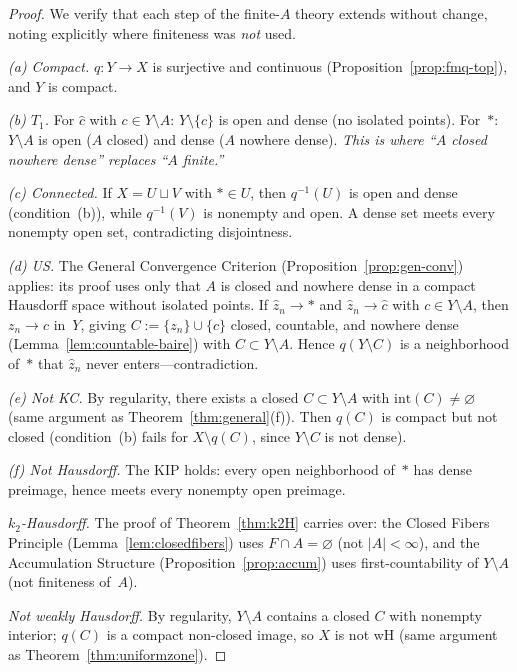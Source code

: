 \documentclass[11pt]{article}
\theoremstyle{definition}
\theoremstyle{remark}
\begin{document}
\begin{proof}
We verify that each step of the finite-$A$ theory extends without
change, noting explicitly where finiteness was \emph{not} used.

\emph{(a) Compact.}\;
$q\colon Y \to X$ is surjective and continuous (Proposition~\ref{prop:fmq-top}),
and $Y$ is compact.

\emph{(b) $T_1$.}\;
For $\hat{c}$ with $c \in Y \setminus A$: $Y \setminus \{c\}$ is
open and dense (no isolated points).
For~$\ast$: $Y \setminus A$ is open ($A$ closed) and dense
($A$ nowhere dense).
\emph{This is where ``$A$ closed nowhere dense'' replaces ``$A$ finite.''}

\emph{(c) Connected.}\;
If $X = U \sqcup V$ with $\ast \in U$, then $q^{-1}(U)$ is open and
dense (condition~(b)), while $q^{-1}(V)$ is nonempty and open.
A dense set meets every nonempty open set, contradicting disjointness.

\emph{(d) US.}\;
The General Convergence Criterion (Proposition~\ref{prop:gen-conv})
applies: its proof uses only that $A$ is closed and nowhere dense
in a compact Hausdorff space without isolated points.
If $\hat{z}_n \to \ast$ and $\hat{z}_n \to \hat{c}$ with
$c \in Y \setminus A$, then $z_n \to c$ in~$Y$, giving
$C := \{z_n\} \cup \{c\}$ closed, countable, and nowhere dense
(Lemma~\ref{lem:countable-baire}) with $C \subset Y \setminus A$.
Hence $q(Y \setminus C)$ is a neighborhood of~$\ast$ that
$\hat{z}_n$ never enters---contradiction.

\emph{(e) Not KC.}\;
By regularity, there exists a closed $C \subset Y \setminus A$ with
$\mathrm{int}(C) \neq \varnothing$ (same argument as
Theorem~\ref{thm:general}(f)).
Then $q(C)$ is compact but not closed (condition~(b) fails for
$X \setminus q(C)$, since $Y \setminus C$ is not dense).

\emph{(f) Not Hausdorff.}\;
The KIP holds: every open neighborhood of~$\ast$ has dense preimage,
hence meets every nonempty open preimage.

\emph{$k_2$-Hausdorff.}\;
The proof of Theorem~\ref{thm:k2H} carries over: the Closed
Fibers Principle (Lemma~\ref{lem:closedfibers}) uses $F \cap A =
\varnothing$ (not $|A| < \infty$), and the Accumulation Structure
(Proposition~\ref{prop:accum}) uses first-countability of
$Y \setminus A$ (not finiteness of~$A$).

\emph{Not weakly Hausdorff.}\;
By regularity, $Y \setminus A$ contains a closed $C$ with nonempty
interior; $q(C)$ is a compact non-closed image, so $X$ is not wH
(same argument as Theorem~\ref{thm:uniformzone}).
\end{proof}
\end{document}
